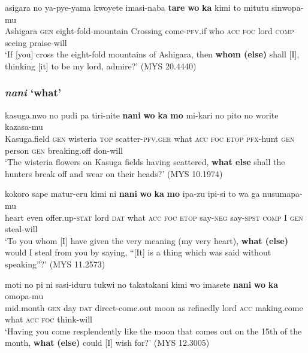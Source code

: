 \documentclass[output=paper]{LSP/langsci}
\begin{document}
\begin{exe}
\ex%
\label{07-fr-ex:19}
\gll asigara no ya-pye-yama kwoyete imasi-naba \textbf{tare} \textbf{wo} \textbf{ka} kimi to mitutu sinwopa-mu\\
Ashigara \textsc{gen} eight-fold-mountain Crossing come-\textsc{pfv}.if  who  \textsc{acc}  \textsc{foc} lord \textsc{comp} seeing praise-will\\
\glt ‘If [you] cross the eight-fold mountains of Ashigara, then \textbf{whom (else)} shall [I], thinking [it] to be my lord, admire?’  (MYS 20.4440)\\
\end{exe}

\subsubsection{\textit{nani} ‘what’}
\label{07-subsubsec:2-2-3}

\begin{exe}
\ex%
\label{07-fr-ex:20}
\gll kasuga.nwo no pudi pa tiri-nite \textbf{nani} \textbf{wo} \textbf{ka} \textbf{mo} mi-kari no pito no worite kazasa-mu\\
Kasuga.field \textsc{gen} wisteria \textsc{top} scatter-\textsc{pfv}.\textsc{ger}  what \textsc{acc} \textsc{foc} \textsc{etop} \textsc{pfx}-hunt \textsc{gen} person \textsc{gen} breaking.off don-will\\
\glt ‘The wisteria flowers on Kasuga fields having scattered, \textbf{what else} shall the hunters break off and wear on their heads?’  (MYS 10.1974)\\
\end{exe}

\begin{exe}
\ex%
\label{07-fr-ex:21}
\gll kokoro sape matur-eru kimi ni \textbf{nani} \textbf{wo} \textbf{ka} \textbf{mo} ipa-zu ipi-si to wa ga nusumapa-mu\\
heart even offer.up-\textsc{stat} lord \textsc{dat} what \textsc{acc}  \textsc{foc}  \textsc{etop} say-\textsc{neg} say-\textsc{spst} \textsc{comp} I \textsc{gen} steal-will\\
\glt ‘To you whom [I] have given the very meaning (my very heart), \textbf{what (else)} would I steal from you by saying, “[It] is a thing which was said without speaking”?’  (MYS 11.2573)\\
\end{exe}

\begin{exe}
\ex%
\label{07-fr-ex:22}
\gll moti no pi ni sasi-iduru tukwi no takatakani kimi wo imasete \textbf{nani} \textbf{wo} \textbf{ka} omopa-mu\\
mid.month \textsc{gen} day \textsc{dat} direct-come.out moon as refinedly lord \textsc{acc} making.come what \textsc{acc} \textsc{foc} think-will\\
\glt ‘Having you come resplendently like the moon that comes out on the 15th of the month, \textbf{what} \textbf{(}\textbf{else}\textbf{)} could [I] wish for?’  (MYS 12.3005)\\
\end{exe}
\end{document}
